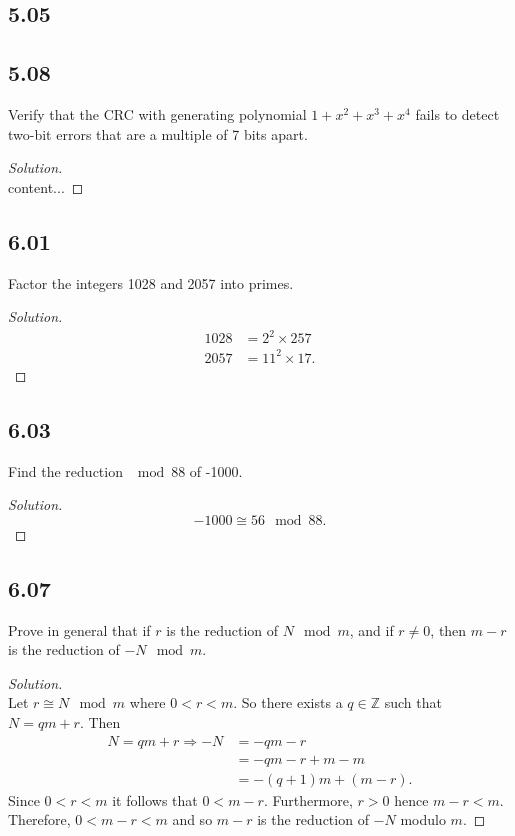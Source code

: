 \documentclass[]{article}
\newcommand\<{\langle}
\renewcommand\>{\rangle}
\newcommand{\ZZ}{\ensuremath{\mathbb{Z}}}
\newenvironment{solution}
{
	\begin{proof}[Solution] \text{ }
		\\
	}
	{
	\end{proof}
}
\begin{document}
\subsection*{5.05}

\subsection*{5.08} Verify that the CRC with generating polynomial $1 + x^2 + x^3 + x^4$ fails to detect two-bit errors that are a multiple of 7 bits apart.
\begin{solution}
	content...
\end{solution}

\subsection*{6.01} Factor the integers 1028 and 2057 into primes.
\begin{solution}
	\begin{align*}
		1028 &= 2^2 \times 257 \\
		2057 &= 11^2 \times 17.
	\end{align*}
\end{solution}

\subsection*{6.03} Find the reduction $\mod 88$ of -1000.
\begin{solution}
	$$
		-1000 \cong 56 \mod 88.
	$$
\end{solution}

\subsection*{6.07} Prove in general that if $r$ is the reduction of $N \mod m$, and if $r \neq 0$, then $m - r$ is the reduction of $-N \mod m$.
\begin{solution}
	Let $r \cong N \mod m$ where $0 < r < m$. So there exists a $q \in \ZZ$ such that $N = qm + r$. Then
	\begin{align*}
		N = qm + r \Rightarrow -N &= -qm - r \\
		&= -qm - r + m - m \\
		&= -(q + 1)m + (m - r).
	\end{align*}
	Since $0 < r < m$ it follows that $0 < m - r$. Furthermore, $r > 0$ hence $m - r < m$. Therefore, $0 < m - r < m$ and so $m - r$ is the reduction of $-N$ modulo $m$.
\end{solution}
\end{document}
